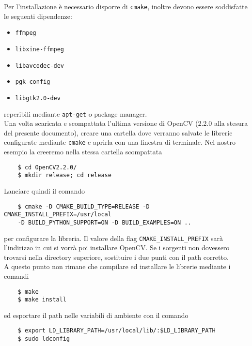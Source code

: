 \documentclass[12pt]{report}
\begin{document}
\noindent Per l'installazione \`e necessario disporre di \verb|cmake|, inoltre devono essere soddisfatte le seguenti dipendenze:
\begin{itemize}
\item \verb|ffmpeg|
\item \verb|libxine-ffmpeg|
\item \verb|libavcodec-dev|
\item \verb|pgk-config|
\item \verb|libgtk2.0-dev|
\end{itemize}

\noindent reperibili mediante \verb|apt-get| o package manager.\\

\noindent Una volta scaricata e scompattata l'ultima versione di OpenCV (2.2.0 alla stesura del presente documento), creare una cartella dove verranno salvate le librerie configurate mediante \verb|cmake| e aprirla con una finestra di terminale. Nel nostro esempio la creeremo nella stessa cartella scompattata

\begin{verbatim}
	$ cd OpenCV2.2.0/
	$ mkdir release; cd release
\end{verbatim}

\noindent Lanciare quindi il comando

\begin{verbatim}
	$ cmake -D CMAKE_BUILD_TYPE=RELEASE -D CMAKE_INSTALL_PREFIX=/usr/local
	-D BUILD_PYTHON_SUPPORT=ON -D BUILD_EXAMPLES=ON ..
\end{verbatim}

\noindent per configurare la libreria. Il valore della flag \verb|CMAKE_INSTALL_PREFIX| sar\`a l'indirizzo in cui si vorr\`a poi installare OpenCV. Se i sorgenti non dovessero trovarsi nella directory superiore, sostituire i due punti con il path corretto.\\

\noindent A questo punto non rimane che compilare ed installare le librerie mediante i comandi

\begin{verbatim}
	$ make
	$ make install
\end{verbatim}

\noindent ed esportare il path nelle variabili di ambiente con il comando

\begin{verbatim}
	$ export LD_LIBRARY_PATH=/usr/local/lib/:$LD_LIBRARY_PATH
	$ sudo ldconfig
\end{verbatim}
\end{document}
